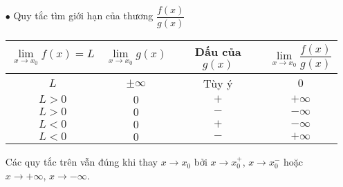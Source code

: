 \begin{itemize}
\begin{itemize}
	\item [$\bullet$] Quy tắc tìm giới hạn của thương $\dfrac{f(x)}{g(x)}$
	\begin{center}
		\begin{tabular}{|c|c|c|c|}
			\hline
			$\lim\limits_{x\to x_0}f(x)=L$ & $\lim\limits_{x\to x_0}g(x)$   & Dấu của $g(x)$ & $\lim\limits_{x\to x_0}\dfrac{f(x)}{g(x)}$\\
			\hline
			$L$   & $\pm \infty $   & Tùy ý & $0$\\
			\hline
			$L>0$   & $0$   & $+$ & $+\infty $\\
			\hline
			$L>0$    & $0$   & $-$ & $-\infty $\\
			\hline
			$L<0$   & $0$   & $+$ & $-\infty $\\
			\hline
			$L<0$    & $0$    & $-$ & $+\infty $\\
			\hline
		\end{tabular}
	\end{center}  
Các quy tắc trên vẫn đúng khi thay $x \to x_0$ bởi  $x \to x_0^+$, $x \to x_0^-$ hoặc $x \to +\infty$, $x \to -\infty$.
\end{itemize}
\end{itemize}

